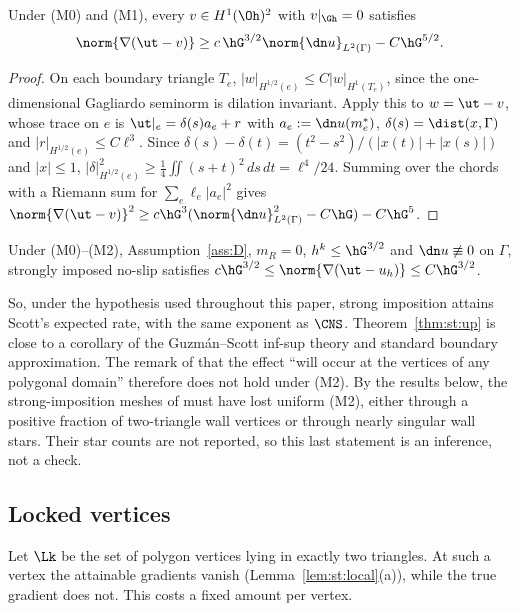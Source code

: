 \begin{theorem}\label{thm:st:low}
Under (M0) and (M1), every $v\in H^1(\Oh)^2$ with $v|_{\Gh}=0$ satisfies
\[
\norm{\nabla(\ut-v)}\ge c\,\hG^{3/2}\norm{\dn u}_{L^2(\Gamma)}-C\hG^{5/2}.
\]
\end{theorem}

\begin{proof}
On each boundary triangle $T_e$, $|w|_{H^{1/2}(e)}\le C|w|_{H^1(T_e)}$, since the one-dimensional Gagliardo seminorm is dilation invariant. Apply this to $w=\ut-v$, whose trace on $e$ is $\ut|_e=\delta(s)a_e+r$ with $a_e:=\dn u(m_e^\ast)$, $\delta(s)=\dist(x,\Gamma)$ and $|r|_{H^{1/2}(e)}\le C\ell^3$. Since $\delta(s)-\delta(t)=(t^2-s^2)/(|x(t)|+|x(s)|)$ and $|x|\le1$, $|\delta|^2_{H^{1/2}(e)}\ge\frac14\iint(s+t)^2\,ds\,dt=\ell^4/24$. Summing over the chords with a Riemann sum for $\sum_e\ell_e|a_e|^2$ gives $\norm{\nabla(\ut-v)}^2\ge c\hG^3(\norm{\dn u}^2_{L^2(\Gamma)}-C\hG)-C\hG^5$.
\end{proof}

\begin{theorem}\label{thm:st:two}
Under (M0)--(M2), Assumption~\ref{ass:D}, $m_R=0$, $h^k\le\hG^{3/2}$ and $\dn u\not\equiv0$ on $\Gamma$, strongly imposed no-slip satisfies $c\hG^{3/2}\le\norm{\nabla(\ut-u_h)}\le C\hG^{3/2}$.
\end{theorem}

So, under the hypothesis used throughout this paper, strong imposition attains Scott's expected rate, with the same exponent as $\CNS$. Theorem~\ref{thm:st:up} is close to a corollary of the Guzm\'an--Scott inf-sup theory and standard boundary approximation. The remark of \cite{GjerdeScott2024} that the effect ``will occur at the vertices of any polygonal domain'' therefore does not hold under (M2). By the results below, the strong-imposition meshes of \cite{GjerdeScott2024} must have lost uniform (M2), either through a positive fraction of two-triangle wall vertices or through nearly singular wall stars. Their star counts are not reported, so this last statement is an inference, not a check.

\subsection{Locked vertices}
Let $\Lk$ be the set of polygon vertices lying in exactly two triangles. At such a vertex the attainable gradients vanish (Lemma~\ref{lem:st:local}(a)), while the true gradient does not. This costs a fixed amount per vertex.

